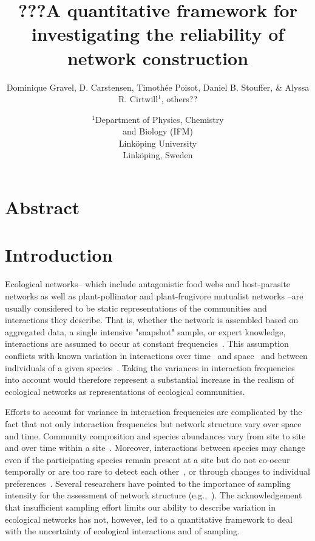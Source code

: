 \documentclass[12pt]{article}
\title{???A quantitative framework for investigating the reliability of network construction}
\author{Dominique Gravel, D. Carstensen, Timoth\'{e}e Poisot, Daniel B. Stouffer, \& Alyssa R. Cirtwill$^{1}$, others??}
\date{\small$^1$Department of Physics, Chemistry\\ 
and Biology (IFM)\\ 
Link\"{o}ping University\\
Link\"{o}ping, Sweden\\
 }
\begin{document}
 
\maketitle 
\raggedright
\setlength{\parindent}{15pt} 


\section*{Abstract}


\section*{Introduction}



    Ecological networks-- which include antagonistic food webs and host-parasite networks as well as plant-pollinator and plant-frugivore mutualist networks --are usually considered to be static representations of the communities and interactions they describe. That is, whether the network is assembled based on aggregated data, a single intensive "snapshot" sample, or expert knowledge, interactions are assumed to occur at constant frequencies~\citep{Olesen2011a}. This assumption conflicts with known variation in interactions over time~\citep{Kitching1987,Olesen2011a} and space~\citep{Kitching1987,Baiser2012} and between individuals of a given species~\citep{Pires2011a,Fodrie2015,Novak2015}. Taking the variances in interaction frequencies into account would therefore represent a substantial increase in the realism of ecological networks as representations of ecological communities.


    Efforts to account for variance in interaction frequencies are complicated by the fact that not only interaction frequencies but network structure vary over space and time. Community composition and species abundances vary from site to site~\citep{Baiser2012} and over time within a site~\citep{Olesen2011a}. Moreover, interactions between species may change even if the participating species remain present at a site but do not co-occur temporally or are too rare to detect each other~\citep{Tylianakis2010}, or through changes to individual preferences~\citep{Fodrie2015}. Several researchers have pointed to the importance of sampling intensity for the assessment of network structure (e.g.,~\citealp{}). The acknowledgement that insufficient sampling effort limits our ability to describe variation in ecological networks has not, however, led to a quantitative framework to deal with the uncertainty of ecological interactions and of sampling.
\end{document}
